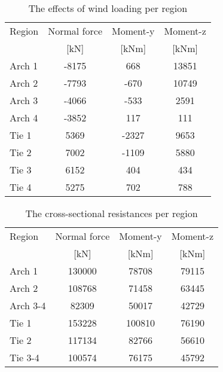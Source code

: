 \begin{table}[H] 
\caption{The effects of wind loading per region}
\centering
\begin{tabular}{lccc}
\hline
Region & Normal force & Moment-y & Moment-z \\
 & [kN]   & [kNm] & [kNm] \\ \hline
Arch 1 & -8175 & 668 & 13851\\
Arch 2 & -7793 & -670 & 10749\\
Arch 3 & -4066 & -533 & 2591\\
Arch 4 & -3852 & 117 & 111\\
Tie 1 & 5369 & -2327 & 9653\\
Tie 2 & 7002 & -1109 & 5880\\
Tie 3 & 6152 & 404 & 434\\
Tie 4 & 5275 & 702 & 788\\ \hline
\end{tabular}
\end{table}

\begin{table}[H] 
\caption{The cross-sectional resistances per region}
\centering
\begin{tabular}{lccc}
\hline
Region & Normal force & Moment-y & Moment-z \\
 & [kN]   & [kNm] & [kNm] \\ \hline
Arch 1 & \SI{130000}{} & \SI{78708}{} & \SI{79115}{}\\
Arch 2 & \SI{108768}{} & \SI{71458}{} & \SI{63445}{}\\
Arch 3-4 & \SI{82309}{} & \SI{50017}{} & \SI{42729}{}\\
Tie 1 & \SI{153228}{} & \SI{100810}{} & \SI{76190}{}\\
Tie 2 & \SI{117134}{} & \SI{82766}{} & \SI{56610}{}\\
Tie 3-4 & \SI{100574}{} & \SI{76175}{} & \SI{45792}{}\\ \hline
\end{tabular}
\end{table}

